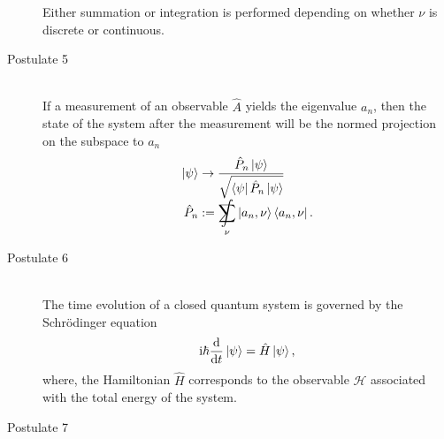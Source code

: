 \begin{description}
\begin{itemize}
\begin{equation}
					\end{equation}
				\end{itemize}
				Either summation or integration is performed depending on whether $\nu$ is discrete or continuous.
			\item[Postulate 5]\hfill \\
				If a measurement of an observable $\hat{A}$ yields the eigenvalue $a_n$, then the state of the system after the measurement will be the normed projection on the subspace to $a_n$
				\begin{equation}
					\begin{aligned}
						\Ket{\psi} &\rightarrow \frac{\hat{P}_n\Ket{\psi}} {\sqrt{\Bra{\psi}\hat{P}_n\Ket{\psi}}} \\
						\hat{P}_n &:= \SumInt_\nu \Ket{a_n,\nu}\Bra{a_n,\nu}. \\
					\end{aligned}
				\end{equation}
			\item[Postulate 6]\hfill \\
				The time evolution of a closed quantum system is governed by the Schrödinger equation
				\begin{equation}
					\mathrm{i}\hbar\frac{\mathrm{d} }{\mathrm{d} t}\Ket{\psi} = \hat{H}\Ket{\psi},
				\end{equation}
				where, the Hamiltonian $\hat{H}$ corresponds to the observable $\mathcal{H}$ associated with the total energy of the system.
			\item[Postulate 7]\hfill \\

\end{description}
